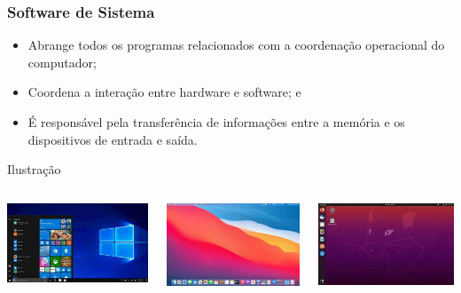 \documentclass[aspectratio=169]{beamer} %
\begin{document}
\begin{frame}
	\frametitle{Software de Sistema}
		
	\begin{itemize}
		\item Abrange todos os programas relacionados com a coordenação operacional do computador;
		\item Coordena a interação entre hardware e software; e
		\item É responsável pela transferência de informações entre a memória e os dispositivos de entrada e saída.
	\end{itemize}\vfill
	
	\begin{exampleblock}{Ilustra\c cão}
		\begin{columns}[c]
				\includegraphics[scale=0.4]{img/windows}
		
				\includegraphics[scale=0.4]{img/macos}
			
				\includegraphics[scale=0.4]{img/ubuntu}
		\end{columns}
	\end{exampleblock}
\end{frame}
\end{document}
